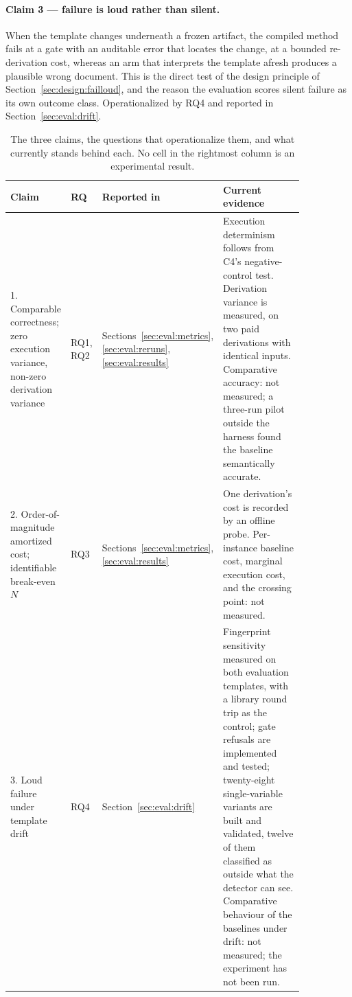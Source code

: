 \paragraph{Claim 3 --- failure is loud rather than silent.}
When the template changes underneath a frozen artifact, the compiled method fails at a gate
with an auditable error that locates the change, at a bounded re-derivation cost, whereas an
arm that interprets the template afresh produces a plausible wrong document. This is the
direct test of the design principle of Section~\ref{sec:design:failloud}, and the reason the
evaluation scores silent failure as its own outcome class. Operationalized by RQ4 and reported
in Section~\ref{sec:eval:drift}.

\begin{table}[htbp]
\centering
\caption{The three claims, the questions that operationalize them, and what currently stands
behind each. No cell in the rightmost column is an experimental result.}
\label{tab:intro:claims}
\begin{tabular}{p{0.17\linewidth}p{0.07\linewidth}p{0.19\linewidth}p{0.42\linewidth}}
\hline
\textbf{Claim} & \textbf{RQ} & \textbf{Reported in} & \textbf{Current evidence} \\
\hline
1. Comparable correctness; zero execution variance, non-zero derivation variance &
RQ1, RQ2 &
Sections~\ref{sec:eval:metrics}, \ref{sec:eval:reruns}, \ref{sec:eval:results} &
Execution determinism follows from C4's negative-control test. Derivation variance is
measured, on two paid derivations with identical inputs. Comparative accuracy: not measured;
a three-run pilot outside the harness found the baseline semantically accurate. \\
2. Order-of-magnitude amortized cost; identifiable break-even $N$ &
RQ3 &
Sections~\ref{sec:eval:metrics}, \ref{sec:eval:results} &
One derivation's cost is recorded by an offline probe. Per-instance baseline cost, marginal
execution cost, and the crossing point: not measured. \\
3. Loud failure under template drift &
RQ4 &
Section~\ref{sec:eval:drift} &
Fingerprint sensitivity measured on both evaluation templates, with a library round trip as
the control; gate refusals are implemented and tested; twenty-eight single-variable variants
are built and validated, twelve of them classified as outside what the detector can see.
Comparative behaviour of the baselines under drift: not measured; the experiment has not
been run. \\
\hline
\end{tabular}
\end{table}

